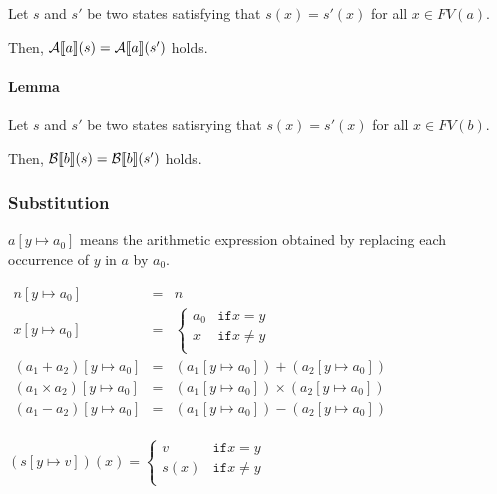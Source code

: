 Let $ s $ and $ s' $ be two states satisfying that $ s(x) = s'(x) $
for all $ x \in FV(a) $.

Then, $ \mathcal{A} \llbracket  a  \rrbracket (s) =\mathcal{A} \llbracket  a  \rrbracket (s') $ holds.

\paragraph{Lemma}

Let $ s $ and $ s' $ be two states satisrying that $ s(x) = s'(x) $
for all $ x \in FV(b) $.

Then, $ \mathcal{B} \llbracket  b  \rrbracket (s) = \mathcal{B} \llbracket  b  \rrbracket (s') $
holds.


\subsubsection{Substitution}

$ a [ y \mapsto a_0 ] $ means the arithmetic expression obtained by
replacing each occurrence of $ y $ in $a $ by $ a_0 $.

\begin{math}
  \begin{array}{rcl}
    n[y \mapsto a_0 ] & = & n \\
    x[y \mapsto a_0 ] & = & \begin{cases}
      a_0 & \mathtt{if} x = y \\
      x & \mathtt{if} x \neq y \\
    \end{cases} \\
    (a_1 + a_2)[y \mapsto a_0] & = & (a_1[y \mapsto a_0]) + (a_2[y \mapsto a_0]) \\
    (a_1 \times a_2)[y \mapsto a_0] & = & (a_1[y \mapsto a_0]) \times (a_2[y \mapsto a_0]) \\
    (a_1 - a_2)[y \mapsto a_0] & = & (a_1[y \mapsto a_0]) - (a_2[y \mapsto a_0]) \\
  \end{array}
\end{math}


\begin{math}
  (s[y \mapsto v])(x) =
  \begin{cases}
    v & \mathtt{if} x = y \\
    s(x) & \mathtt{if} x \neq y \\
  \end{cases}
\end{math}



